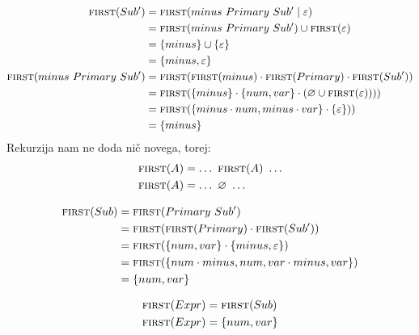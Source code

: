 \documentclass{report}
\newcommand{\Empty}{\varnothing}
\newcommand{\Null}{\varepsilon}
\newcommand{\Seq}{\cdot}
\newcommand{\Spc}{\ }
\newcommand{\Union}{\mathrel{|}}
\newcommand{\FIRST}{\textsc{first}}
\newcommand{\NT}[1]{{#1}}
\newcommand{\T}[1]{{#1}}
\begin{document}
\begin{equation*}
  \begin{aligned}
    \FIRST(\NT{Sub'}) &= \FIRST(\T{minus} \Spc \NT{Primary} \Spc \NT{Sub'} \Union \Null)\\
    &= \FIRST(\T{minus} \Spc \NT{Primary} \Spc \NT{Sub'}) \cup \FIRST(\Null)\\
    &= \{\T{minus}\} \cup \{\Null\}\\
    &= \{\T{minus}, \Null\}\\
    \FIRST(\T{minus} \Spc \NT{Primary} \Spc \NT{Sub'}) 
    &= \FIRST(\FIRST(\T{minus}) \Seq \FIRST(\NT{Primary}) \Seq \FIRST(\NT{Sub'}))\\
    &= \FIRST(\{\T{minus}\} \Seq \{\T{num}, \T{var}\} \Seq (\Empty \cup \FIRST(\Null))))\\
    &= \FIRST(\{\T{minus} \Seq \T{num}, \T{minus} \Seq \T{var} \} \Seq \{\Null\}))\\
    &= \{\T{minus}\}
  \end{aligned}
\end{equation*}
Rekurzija nam ne doda nič novega, torej:
\begin{equation*}
  \begin{aligned}
    \FIRST(A) &= \dots \Spc \FIRST(A) \Spc \dots\\
    \FIRST(A) &= \dots \Spc \Empty \Spc \dots
  \end{aligned}
\end{equation*}

\begin{equation*}
  \begin{aligned}
    \FIRST(\NT{Sub}) &= \FIRST(\T{Primary} \Spc \NT{Sub'})\\
    &= \FIRST(\FIRST(\T{Primary}) \Seq \FIRST(\NT{Sub'}))\\
    &= \FIRST(\{\T{num}, \T{var}\} \Seq \{\T{minus}, \Null\})\\
    &= \FIRST(\{\T{num} \Seq \T{minus}, \T{num}, \T{var} \Seq \T{minus}, \T{var}\})\\
    &= \{\T{num}, \T{var}\}
  \end{aligned}
\end{equation*}

\begin{equation*}
  \begin{aligned}
    \FIRST(\NT{Expr}) &= \FIRST(\T{Sub})\\
    \FIRST(\NT{Expr}) &= \{\T{num}, \T{var}\}
  \end{aligned}
\end{equation*}
\end{document}
